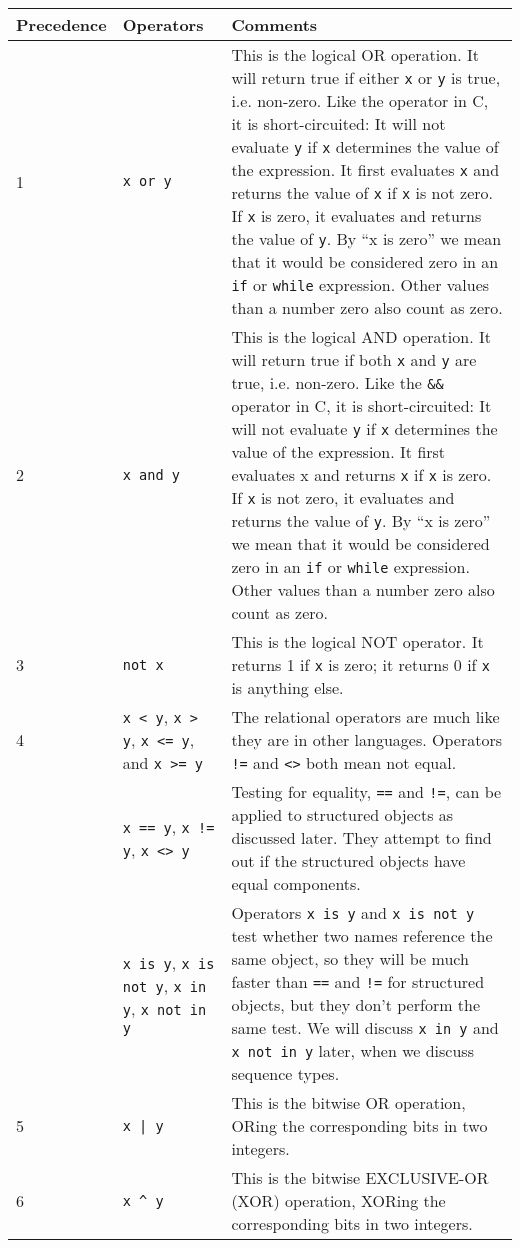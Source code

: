 \begin{longtable}{l|p{3cm}|p{7cm}}
\toprule
Precedence & Operators & Comments \\
\midrule
  1 & \texttt{x or y} &  This is the logical OR operation.
It will return true if either \texttt{x} or \texttt{y} is true, i.e.
non-zero. Like the \texttt{\textbar{}\textbar{}} operator in C, it is
short-circuited: It will not evaluate \texttt{y} if \texttt{x} determines
the value of the expression. It first evaluates \texttt{x} and returns the
value of \texttt{x} if \texttt{x} is not zero. If \texttt{x} is zero, it
evaluates and returns the value of \texttt{y}. By ``x is zero'' we mean
that it would be considered zero in an \texttt{if} or \texttt{while}
expression. Other values than a number zero also count as zero. \\
%
\midrule
  2 & \texttt{x and y} & This is the logical AND operation.
It will return true if both \texttt{x} and \texttt{y} are true, i.e.
non-zero. Like the \texttt{\&\&} operator in C, it is short-circuited: It
will not evaluate \texttt{y} if \texttt{x} determines the value of the
expression. It first evaluates x and returns \texttt{x} if \texttt{x} is
zero. If \texttt{x} is not zero, it evaluates and returns the value of
\texttt{y}. By ``x is zero'' we mean that it would be considered zero in
an \texttt{if} or \texttt{while} expression. Other values than a number zero
also count as zero. \\
%
\midrule
  3 & \texttt{not x} & This is the logical NOT operator. 
It returns 1 if \texttt{x} is zero; it returns 0 if \texttt{x} is anything
else. \\
%
\midrule
  4 & \verb"x < y", \verb"x > y", \verb"x <= y", and \verb"x >= y"  & The relational operators are much
like they are in other languages. Operators \verb"!=" and \verb"<>" both mean not equal. \\
%
   & \verb"x == y", \verb"x != y", \verb"x <> y"  & Testing for equality, \verb"==" and \verb"!=", can be applied to structured objects as discussed later.
They attempt to find out if the structured objects have equal
components. \\
%
   & \verb"x is y", \verb"x is not y", \verb"x in y", \verb"x not in y"  & Operators \verb"x is y" and \verb"x is not y"
test whether two names reference the same object, so they will be much
faster than \verb"==" and \verb"!=" for structured objects, but they don't perform the
same test.  We will discuss \verb"x in y" and \verb"x not in y" later, when we discuss sequence types.\\
%
\midrule
  5 & \verb"x | y" &  This is the bitwise OR operation,
ORing the corresponding bits in two integers. \\
%
\midrule
  6  & \verb"x ^ y" & This is the bitwise EXCLUSIVE-OR (XOR) operation, XORing the corresponding bits in two integers. \\
%
\midrule


\end{longtable}
